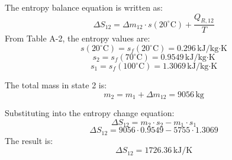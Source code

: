 The entropy balance equation is written as:  
\[
\Delta S_{12} = \Delta m_{12} \cdot s(20^\circ\text{C}) + \frac{Q_{R,12}}{T}
\]  
From Table A-2, the entropy values are:  
\[
s(20^\circ\text{C}) = s_f(20^\circ\text{C}) = 0.296 \, \text{kJ/kg·K}
\]  
\[
s_2 = s_f(70^\circ\text{C}) = 0.9549 \, \text{kJ/kg·K}
\]  
\[
s_1 = s_f(100^\circ\text{C}) = 1.3069 \, \text{kJ/kg·K}
\]  

The total mass in state 2 is:  
\[
m_2 = m_1 + \Delta m_{12} = 9056 \, \text{kg}
\]  

Substituting into the entropy change equation:  
\[
\Delta S_{12} = m_2 \cdot s_2 - m_1 \cdot s_1
\]  
\[
\Delta S_{12} = 9056 \cdot 0.9549 - 5755 \cdot 1.3069
\]  
The result is:  
\[
\Delta S_{12} = 1726.36 \, \text{kJ/K}
\]